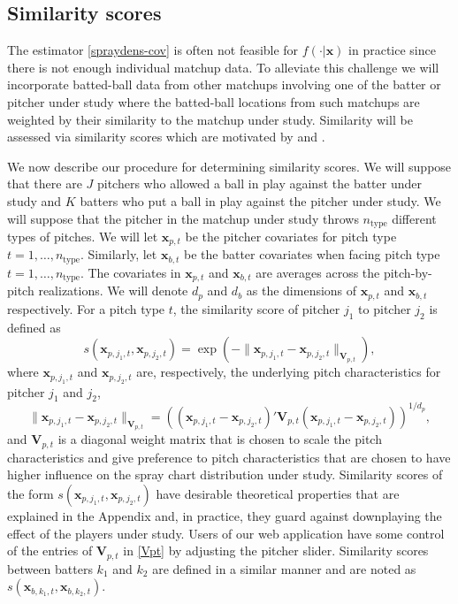 \documentclass[12pt]{article}
\newcommand{\V}{\textbf{V}}
\newcommand{\x}{\textbf{x}}
\begin{document}
\subsection{Similarity scores}

The estimator \eqref{spraydens-cov} is often not feasible for $f(\cdot|\textbf{x})$ in practice since there is not enough individual matchup data. To alleviate this challenge we will incorporate batted-ball data from other matchups involving one of the batter or pitcher under study where the batted-ball locations from such matchups are weighted by their similarity to the matchup under study. Similarity will be assessed via similarity scores which are motivated by \cite{james1994politics} and \cite{PECOTA}.


We now describe our procedure for determining similarity scores. We will suppose that there are $J$ pitchers who allowed a ball in play against the batter under study and $K$ batters who put a ball in play against the pitcher under study. We will suppose that the pitcher in the matchup under study throws $n_{\text{type}}$ different types of pitches. We will let $\x_{p,t}$ be the pitcher covariates for pitch type $t = 1,\ldots,n_{\text{type}}$. Similarly, let $\x_{b,t}$ be the batter covariates when facing pitch type $t = 1,\ldots,n_{\text{type}}$. The covariates in $\x_{p,t}$ and $\x_{b,t}$ are averages across the pitch-by-pitch realizations. We will denote $d_p$ and $d_b$ as the dimensions of $\x_{p,t}$ and $\x_{b,t}$ respectively. For a pitch type $t$, the similarity score of pitcher $j_1$ to pitcher $j_2$ is defined as 
$$
  s(\x_{p,j_1,t}, \x_{p,j_2,t}) = \exp(-\|\x_{p,j_1,t}-\x_{p,j_2,t}\|_{\V_{p,t}}),
$$ 
where $\x_{p,j_1,t}$ and $\x_{p,j_2,t}$ are, respectively, the underlying pitch characteristics for pitcher $j_1$ and $j_2$,
\begin{equation} \label{Vpt}
   \|\x_{p,j_1,t}-\x_{p,j_2,t}\|_{\V_{p,t}}
     = \left((\x_{p,j_1,t}-\x_{p,j_2,t})'\V_{p,t}(\x_{p,j_1,t}-\x_{p,j_2,t})\right)^{1/d_p},
\end{equation}
and $\V_{p,t}$ is a diagonal weight matrix that is chosen to scale the pitch characteristics and give preference to pitch characteristics that are chosen to have higher influence on the spray chart distribution under study. Similarity scores of the form $s(\x_{p,j_1,t}, \x_{p,j_2,t})$ have desirable theoretical properties that are explained in the Appendix and, in practice, they guard against downplaying the effect of the players under study. Users of our web application have some control of the entries of $\V_{p,t}$ in \eqref{Vpt} by adjusting the pitcher slider. Similarity scores between batters $k_1$ and $k_2$ are defined in a similar manner and are noted as $s(\x_{b,k_1,t}, \x_{b,k_2,t})$.
\end{document}
